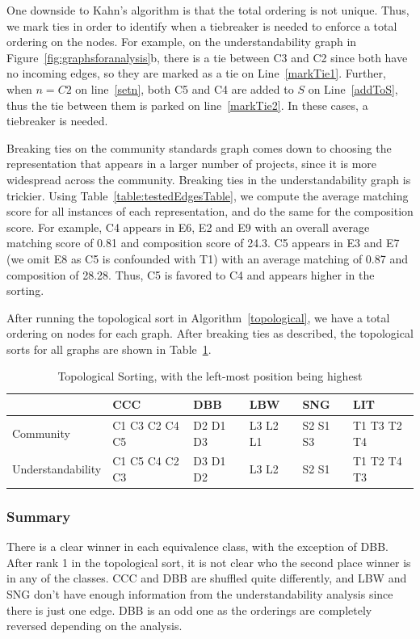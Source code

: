 One downside to Kahn's algorithm is that the total ordering is not unique. Thus, we mark ties in order to identify when a tiebreaker is needed to enforce a total ordering on the nodes. For example, on the understandability graph in Figure~\ref{fig:graphsforanalysis}b, there is a tie between C3 and C2 since both have no incoming edges, so they are marked as a tie on Line~\ref{markTie1}. Further, when $n=C2$ on line~\ref{setn}, both C5 and C4 are added to $S$ on Line~\ref{addToS}, thus the tie between them is parked on line~\ref{markTie2}. In these cases, a tiebreaker is needed.

Breaking ties on the community standards graph comes down to choosing the representation that appears in a larger number of projects, since it is more widespread across the community. Breaking ties in the understandability graph is trickier. Using Table~\ref{table:testedEdgesTable}, we compute the average matching score for all instances of each representation, and do the same for the composition score. For example, C4 appears in E6, E2 and E9 with an overall average matching score of 0.81 and composition score of 24.3. C5 appears in E3 and E7 (we omit E8 as C5 is confounded with T1) with an average matching of 0.87 and composition of 28.28. Thus, C5 is favored to C4 and appears higher in the sorting.

After running the topological sort in Algorithm~\ref{topological}, we have a total ordering on nodes for each graph. After breaking ties as described, the topological sorts for all graphs are shown in Table~\ref{topologicalResults}.

\begin{table}
\centering
\caption{Topological Sorting, with the left-most position being highest \label{topologicalResults}}
\begin{tabular}{|| l || l || l || l || l || l ||}
				& CCC			& DBB 		& LBW & SNG & LIT \\ \hline
Community 		& C1 C3 C2 C4 C5 	& D2 D1 D3	&  L3 L2 L1 	& S2 S1 S3 	& T1 T3 T2 T4 \\
Understandability 	& C1 C5 C4 C2 C3 	& D3 D1 D2 	& L3 L2		& S2 S1		& T1 T2 T4 T3 \\

\end{tabular}
\end{table}

\subsubsection{Summary}
There is a clear winner in each equivalence class, with the exception of DBB. After rank 1 in the topological sort, it is not clear who the second place winner is in any of the classes. CCC and DBB are shuffled quite differently, and LBW and SNG don't have enough information from the understandability analysis since there is just one edge. DBB is an odd one as the orderings are completely reversed depending on the analysis.

